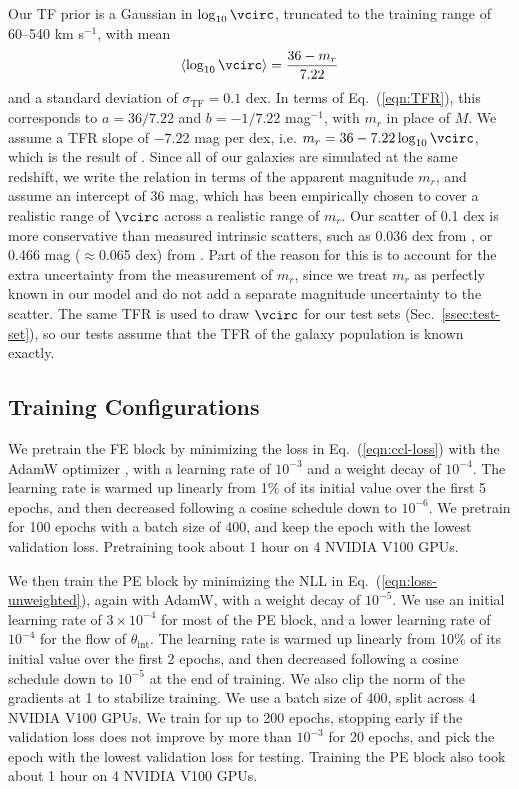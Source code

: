 Our TF prior is a Gaussian in $\log_{10}\vcirc$, truncated to the training range of 60--540 km s$^{-1}$, with mean
\begin{equation}
\label{eqn:tf-mean}
    \langle\log_{10}\vcirc\rangle = \frac{36 - m_r}{7.22}
\end{equation}
and a standard deviation of $\sigma_\mathrm{TF}=0.1$ dex. In terms of Eq.~(\ref{eqn:TFR}), this corresponds to $a = 36/7.22$ and $b = -1/7.22$ mag$^{-1}$, with $m_r$ in place of $M$. We assume a TFR slope of $-7.22$ mag per dex, i.e. $m_r = 36 - 7.22\log_{10}\vcirc$, which is the result of \citep{DESIPVTF2025}. Since all of our galaxies are simulated at the same redshift, we write the relation in terms of the apparent magnitude $m_r$, and assume an intercept of 36 mag, which has been empirically chosen to cover a realistic range of $\vcirc$ across a realistic range of $m_r$. Our scatter of 0.1 dex is more conservative than measured intrinsic scatters, such as 0.036 dex from \citep{Reyes11}, or 0.466 mag ($\approx$0.065 dex) from \citep{DESIPVTF2025}. Part of the reason for this is to account for the extra uncertainty from the measurement of $m_r$, since we treat $m_r$ as perfectly known in our model and do not add a separate magnitude uncertainty to the scatter.  The same TFR is used to draw $\vcirc$ for our test sets (Sec.~\ref{ssec:test-set}), so our tests assume that the TFR of the galaxy population is known exactly.

\subsection{Training Configurations}
\label{ssec:train-conf}
We pretrain the FE block by minimizing the loss in Eq.~(\ref{eqn:ccl-loss}) with the AdamW optimizer \citep{AdamW}, with a learning rate of $10^{-3}$ and a weight decay of $10^{-4}$. The learning rate is warmed up linearly from 1\% of its initial value over the first 5 epochs, and then decreased following a cosine schedule down to $10^{-6}$. We pretrain for 100 epochs with a batch size of 400, and keep the epoch with the lowest validation loss. Pretraining took about 1 hour on 4 NVIDIA V100 GPUs.

We then train the PE block by minimizing the NLL in Eq.~(\ref{eqn:loss-unweighted}), again with AdamW, with a weight decay of $10^{-5}$. We use an initial learning rate of $3\times10^{-4}$ for most of the PE block, and a lower learning rate of $10^{-4}$ for the flow of $\theta_\mathrm{int}$. The learning rate is warmed up linearly from 10\% of its initial value over the first 2 epochs, and then decreased following a cosine schedule down to $10^{-5}$ at the end of training. We also clip the norm of the gradients at 1 to stabilize training. We use a batch size of 400, split across 4 NVIDIA V100 GPUs. We train for up to 200 epochs, stopping early if the validation loss does not improve by more than $10^{-3}$ for 20 epochs, and pick the epoch with the lowest validation loss for testing. Training the PE block also took about 1 hour on 4 NVIDIA V100 GPUs. 
